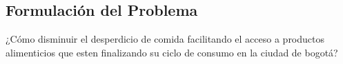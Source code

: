 \subsection{Formulación del Problema}

¿Cómo disminuir el desperdicio de comida facilitando el acceso a productos alimenticios que esten finalizando su ciclo de consumo en la ciudad de bogotá?



